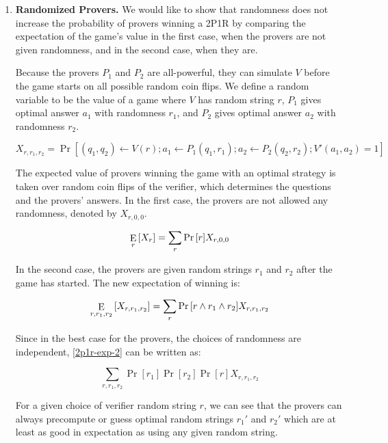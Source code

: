 \documentclass[12pt]{article}
\def\Exp{\mathop{\rm {E}}}
\begin{document}
\begin{enumerate}

\item
\textbf{Randomized Provers.}
We would like to show that randomness does not increase the probability of
provers winning a 2P1R by comparing the expectation of the game's value
in the first case, when the provers are not given randomness, and in the
second case, when they are.

Because the provers $P_1$ and $P_2$ are all-powerful, they can simulate
$V$ before the game starts on all possible random coin flips.
We define a random variable to
be the value of a game where $V$ has random string $r$, $P_1$ gives optimal
answer $a_1$ with randomness $r_1$, and $P_2$ gives optimal answer $a_2$
with randomness $r_2$.

\begin{equation}
X_{r,r_1,r_2} = \Pr{\left[(q_1,q_2)\leftarrow V(r); a_1\leftarrow P_1(q_1,r_1); a_2\leftarrow P_2(q_2,r_2); V'(a_1,a_2) = 1\right]}
\end{equation}

The expected value of provers winning the game with an optimal
strategy is taken over random coin flips of the verifier, which
determines the questions and the provers' answers. In the first case,
the provers are not allowed any randomness, denoted by $X_{r,0,0}$.

\begin{equation}
\label{2p1r-exp-1}
\Exp_{r}{\left[ X_{r}\right]} = \sum_{r}{\Pr{\left[r\right]}X_{r,0,0}}
\end{equation}

In the second case, the provers are given random strings $r_1$ and $r_2$ after
the game has started. The new expectation of winning is:

\begin{equation}
\label{2p1r-exp-2}
\Exp_{r,r_1,r_2}{\left[ X_{r,r_1,r_2}\right]} = \sum_{r}{\Pr{\left[r \land r_1 \land r_2\right]}X_{r,r_1,r_2}}
\end{equation}

Since in the best case for the provers, the choices of randomness are
independent, \ref{2p1r-exp-2} can be written as:

\begin{equation}
\sum_{r,r_1,r_2}{\Pr{\left[r_1\right]}\Pr{\left[r_2\right]}\Pr{\left[r\right]}X_{r,r_1,r_2}}
\end{equation}

For a given choice of verifier random string $r$, we can see that the
provers can always precompute or guess optimal random strings $r_1'$ and $r_2'$
which are at least as good in expectation
as using any given random string.


\end{enumerate}
\end{document}

